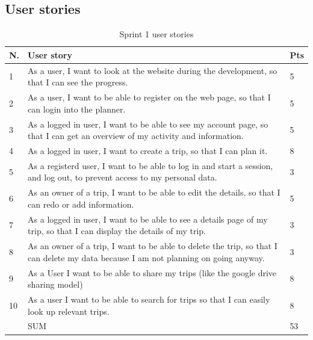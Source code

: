 \documentclass[a4paper]{article}
\begin{document}
\subsection{User stories}
\label{sec:user-stories}



\begin{table}
  \begin{tabulary}{1.0\textwidth}{|L|L|L|}
    \hline
    N. & User story & Pts \\ \hline
    
    1&As a user, I want to look at the website during the development, so that I can see the progress.
    & 5 \\ \hline
    
    2&As a user, I want to be able to register on the web page, so that I can login into the planner.
    & 5 \\ \hline

    3&As a logged in user, I want to be able to see my account page, so that I can get an overview of my activity and information.
    & 5 \\ \hline

    4&As a logged in user, I want to create a trip, so that I can plan it. 
    & 8 \\ \hline

    5&As a registerd user, I want to be able to log in and start a session, and log out, to prevent access to my personal data. & 3 \\ \hline

    6&As an owner of a trip, I want to be able to edit the details, so that I can redo or add information. & 5 \\ \hline

    7&As a logged in user, I want to be able to see a details page of my trip, so that I can display the details of my trip. & 3 \\ \hline

    8&As an owner of a trip, I want to be able to delete the trip, so that I can delete my data because I am not planning on going anyway. & 3 \\ \hline

    9&As a User I want to be able to share my trips (like the google drive sharing model) & 8 \\ \hline

    10&As a user I want to be able to search for trips so that I can easily look up relevant trips. & 8 \\ \hline
    &SUM & 53 \\ \hline
  \end{tabulary}
  \caption{Sprint 1 user stories}
\end{table}
\end{document}
